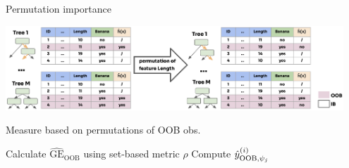 \documentclass[11pt,compress,t,notes=noshow, xcolor=table]{beamer}
\begin{document}
\begin{vbframe}{Permutation importance}

\includegraphics[width = 0.95\textwidth]{figure_man/forest-permutation-imp.png}
\vspace{-1.2ex}
\begin{algorithm}[H]
\small
\caption*{Measure based on permutations of OOB obs.}
\begin{algorithmic}[1]
  \State Calculate $\widehat{\mathrm{GE}}_{\text{OOB}}$ using set-based metric $\rho$
		\State Compute {$\hat{y}^{(i)}_{\text{OOB},\psi_j}$}
	  \EndFor
  \EndFor
\end{algorithmic}
\end{algorithm}
\vspace{-3ex}
\end{vbframe}
\end{document}
